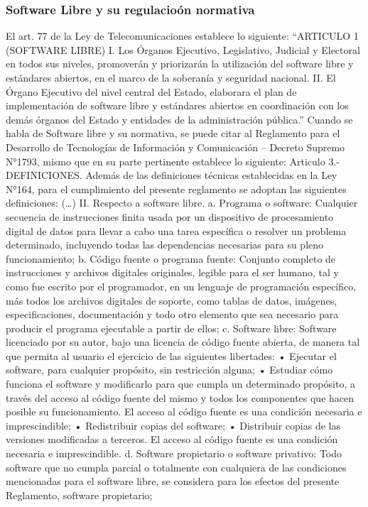 \subsubsection{Software Libre y su regulacioón normativa}
El art. 77 de la Ley de Telecomunicaciones establece lo siguiente: “ARTICULO 1 (SOFTWARE LIBRE) I. Los Órganos Ejecutivo, Legislativo, Judicial y Electoral en todos sus niveles, promoverán y priorizarán la utilización del software libre y estándares abiertos, en el marco de la soberanía y seguridad nacional. II. El Órgano Ejecutivo del nivel central del Estado, elaborara el plan de implementación de software libre y estándares abiertos en coordinación con los demás órganos del Estado y entidades de la administración pública.”
Cuando se habla de Software libre y su normativa, se puede citar al Reglamento para el Desarrollo de Tecnologías de Información y Comunicación – Decreto Supremo N°1793, mismo que en su parte pertinente establece lo siguiente: Articulo 3.- DEFINICIONES. Además de las definiciones técnicas establecidas en la Ley N°164, para el cumplimiento del presente reglamento se adoptan las siguientes definiciones: (…) II. Respecto a software libre. 
a. Programa o software: Cualquier secuencia de instrucciones finita usada por un dispositivo de procesamiento digital de datos para llevar a cabo una tarea específica o resolver un problema determinado, incluyendo todas las dependencias necesarias para su pleno funcionamiento; 
b. Código fuente o programa fuente: Conjunto completo de instrucciones y archivos digitales originales, legible para el ser humano, tal y como fue escrito por el programador, en un lenguaje de programación específico, más todos los archivos digitales de soporte, como tablas de datos, imágenes, especificaciones, documentación y todo otro elemento que sea necesario para producir el programa ejecutable a partir de ellos; 
c. Software libre: Software licenciado por su autor, bajo una licencia de código fuente abierta, de manera tal que permita al usuario el ejercicio de las siguientes libertades:
• Ejecutar el software, para cualquier propósito, sin restricción alguna; 
• Estudiar cómo funciona el software y modificarlo para que cumpla un determinado propósito, a través del acceso al código fuente del mismo y todos los componentes que hacen posible su funcionamiento. El acceso al código fuente es una condición necesaria e imprescindible; 
• Redistribuir copias del software; 
• Distribuir copias de las versiones modificadas a terceros. El acceso al código fuente es una condición necesaria e imprescindible. 
d. Software propietario o software privativo: Todo software que no cumpla parcial o totalmente con cualquiera de las condiciones mencionadas para el software libre, se considera para los efectos del presente Reglamento, software propietario; 
